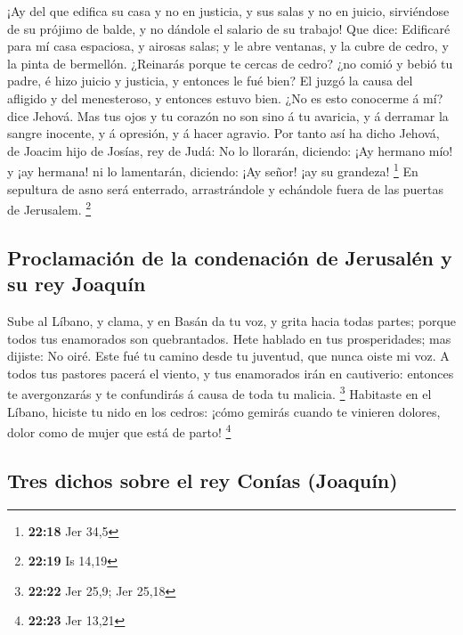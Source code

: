  ¡Ay del que edifica su casa y no en justicia, y sus salas
y no en juicio, sirviéndose de su prójimo de balde, y no dándole el
salario de su trabajo!  Que dice: Edificaré para mí casa
espaciosa, y airosas salas; y le abre ventanas, y la cubre de cedro, y
la pinta de bermellón.  ¿Reinarás porque te cercas de
cedro? ¿no comió y bebió tu padre, é hizo juicio y justicia, y entonces
le fué bien?  El juzgó la causa del afligido y del
menesteroso, y entonces estuvo bien. ¿No es esto conocerme á mí? dice
Jehová.  Mas tus ojos y tu corazón no son sino á tu
avaricia, y á derramar la sangre inocente, y á opresión, y á hacer
agravio.  Por tanto así ha dicho Jehová, de Joacim hijo de
Josías, rey de Judá: No lo llorarán, diciendo: ¡Ay hermano mío! y ¡ay
hermana! ni lo lamentarán, diciendo: ¡Ay señor! ¡ay su grandeza!
\footnote{\textbf{22:18} Jer 34,5}  En sepultura de asno
será enterrado, arrastrándole y echándole fuera de las puertas de
Jerusalem. \footnote{\textbf{22:19} Is 14,19}

\hypertarget{proclamaciuxf3n-de-la-condenaciuxf3n-de-jerusaluxe9n-y-su-rey-joaquuxedn}{%
\subsection{Proclamación de la condenación de Jerusalén y su rey
Joaquín}\label{proclamaciuxf3n-de-la-condenaciuxf3n-de-jerusaluxe9n-y-su-rey-joaquuxedn}}

 Sube al Líbano, y clama, y en Basán da tu voz, y grita
hacia todas partes; porque todos tus enamorados son quebrantados.
 Hete hablado en tus prosperidades; mas dijiste: No oiré.
Este fué tu camino desde tu juventud, que nunca oiste mi voz.
 A todos tus pastores pacerá el viento, y tus enamorados
irán en cautiverio: entonces te avergonzarás y te confundirás á causa de
toda tu malicia. \footnote{\textbf{22:22} Jer 25,9; Jer 25,18}
 Habitaste en el Líbano, hiciste tu nido en los cedros:
¡cómo gemirás cuando te vinieren dolores, dolor como de mujer que está
de parto! \footnote{\textbf{22:23} Jer 13,21}

\hypertarget{tres-dichos-sobre-el-rey-conuxedas-joaquuxedn}{%
\subsection{Tres dichos sobre el rey Conías
(Joaquín)}\label{tres-dichos-sobre-el-rey-conuxedas-joaquuxedn}}

